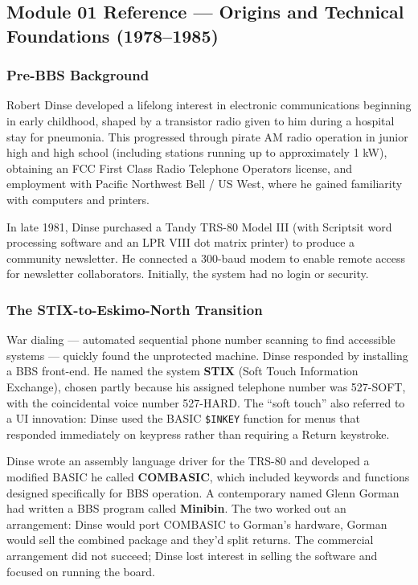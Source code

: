 \documentclass[11pt,letterpaper]{article}
\begin{document}
\subsection{Module 01 Reference --- Origins and Technical Foundations (1978--1985)}

\subsubsection{Pre-BBS Background}

Robert Dinse developed a lifelong interest in electronic communications beginning in early childhood, shaped by a transistor radio given to him during a hospital stay for pneumonia. This progressed through pirate AM radio operation in junior high and high school (including stations running up to approximately 1 kW), obtaining an FCC First Class Radio Telephone Operators license, and employment with Pacific Northwest Bell / US West, where he gained familiarity with computers and printers.

In late 1981, Dinse purchased a Tandy TRS-80 Model III (with Scriptsit word processing software and an LPR VIII dot matrix printer) to produce a community newsletter. He connected a 300-baud modem to enable remote access for newsletter collaborators. Initially, the system had no login or security.

\subsubsection{The STIX-to-Eskimo-North Transition}

War dialing --- automated sequential phone number scanning to find accessible systems --- quickly found the unprotected machine. Dinse responded by installing a BBS front-end. He named the system \textbf{STIX} (Soft Touch Information Exchange), chosen partly because his assigned telephone number was 527-SOFT, with the coincidental voice number 527-HARD. The ``soft touch'' also referred to a UI innovation: Dinse used the BASIC \texttt{\$INKEY} function for menus that responded immediately on keypress rather than requiring a Return keystroke.

Dinse wrote an assembly language driver for the TRS-80 and developed a modified BASIC he called \textbf{COMBASIC}, which included keywords and functions designed specifically for BBS operation. A contemporary named Glenn Gorman had written a BBS program called \textbf{Minibin}. The two worked out an arrangement: Dinse would port COMBASIC to Gorman's hardware, Gorman would sell the combined package and they'd split returns. The commercial arrangement did not succeed; Dinse lost interest in selling the software and focused on running the board.
\end{document}
